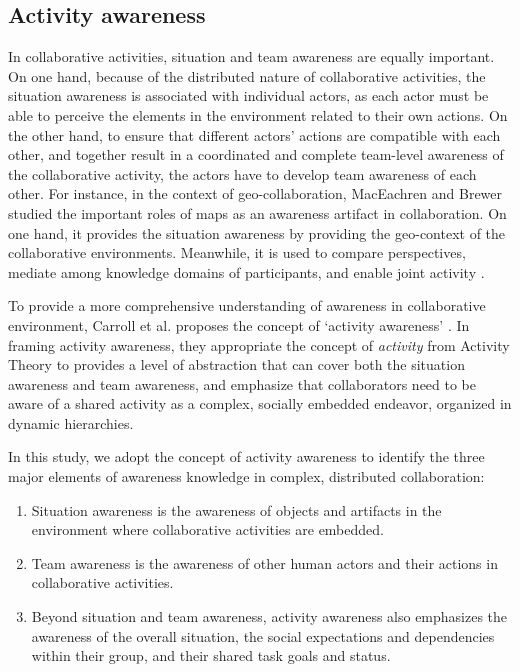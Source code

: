 \subsection{Activity awareness} %
\label{sub:activity_awareness}
In collaborative activities, situation and team awareness are equally important. On one hand, because of the distributed nature of collaborative activities, the situation awareness is associated with individual actors, as each actor must be able to perceive the elements in the environment related to their own actions. On the other hand, to ensure that different actors' actions are compatible with each other, and together result in a coordinated and complete team-level awareness of the collaborative activity, the actors have to develop team awareness of each other. For instance, in the context of geo-collaboration, MacEachren and Brewer studied the important roles of maps as an awareness artifact in collaboration. On one hand, it provides the situation awareness by providing the geo-context of the collaborative environments. Meanwhile, it is used to compare perspectives, mediate among knowledge domains of participants, and enable joint activity \cite{Maceachren2004}.

To provide a more comprehensive understanding of awareness in collaborative environment, Carroll et al. proposes the concept of `activity awareness' \cite{carroll2003a,carroll2006a}. In framing activity awareness, they appropriate the concept of \emph{activity} from Activity Theory to provides a level of abstraction that can cover both the situation awareness and team awareness, and emphasize that collaborators need to be aware of a shared activity as a complex, socially embedded endeavor, organized in dynamic hierarchies. 

In this study, we adopt the concept of activity awareness to identify the three major elements of awareness knowledge in complex, distributed collaboration: 

\begin{enumerate}
   \item Situation awareness is the awareness of objects and artifacts in the environment where collaborative activities are embedded.
   \item Team awareness is the awareness of other human actors and their actions in collaborative activities.
   \item Beyond situation and team awareness, activity awareness also emphasizes the awareness of the overall situation, the social expectations and dependencies within their group, and their shared task goals and status.
\end{enumerate}

